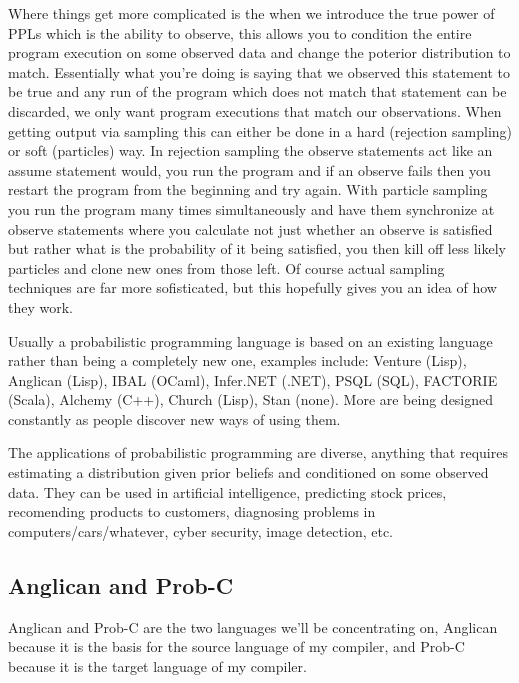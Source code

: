 \documentclass[a4paper]{article}
\begin{document}
Where things get more complicated is the when we introduce the true power of PPLs which is the ability to observe, this allows you to condition the entire program execution on some observed data and change the poterior distribution to match. Essentially what you're doing is saying that we observed this statement to be true and any run of the program which does not match that statement can be discarded, we only want program executions that match our observations. When getting output via sampling this can either be done in a hard (rejection sampling) or soft (particles) way. In rejection sampling the observe statements act like an assume statement would, you run the program and if an observe fails then you restart the program from the beginning and try again. With particle sampling you run the program many times simultaneously and have them synchronize at observe statements where you calculate not just whether an observe is satisfied but rather what is the probability of it being satisfied, you then kill off less likely particles and clone new ones from those left. Of course actual sampling techniques are far more sofisticated, but this hopefully gives you an idea of how they work.

Usually a probabilistic programming language is based on an existing language rather than being a completely new one, examples include: Venture (Lisp), Anglican (Lisp), IBAL (OCaml), Infer.NET (.NET), PSQL (SQL), FACTORIE (Scala), Alchemy (C++), Church (Lisp), Stan (none). More are being designed constantly as people discover new ways of using them.

The applications of probabilistic programming are diverse, anything that requires estimating a distribution given prior beliefs and conditioned on some observed data. They can be used in artificial intelligence, predicting stock prices, recomending products to customers, diagnosing problems in computers/cars/whatever, cyber security, image detection, etc.




\subsection{Anglican and Prob-C}

Anglican and Prob-C are the two languages we'll be concentrating on, Anglican because it is the basis for the source language of my compiler, and Prob-C because it is the target language of my compiler.
\end{document}
